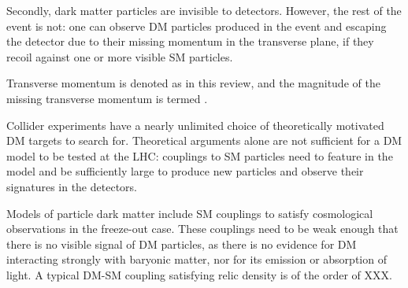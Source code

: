 
Secondly, dark matter particles are invisible to detectors. 
However, the rest of the event is not: one can observe DM particles
produced in the event and escaping the detector 
due to their missing momentum in the transverse plane, 
if they recoil against one or more visible SM particles. 

\begin{marginnote}[]
Transverse momentum is denoted as \pt in this review, 
and the magnitude of the missing transverse momentum is 
termed \MET. 
\end{marginnote}



Collider experiments have a nearly unlimited choice of theoretically
motivated DM targets to search for. 
Theoretical arguments alone are not sufficient for a DM model to be tested at the LHC: 
couplings to SM particles need to feature in the model and be sufficiently large
to produce new particles and observe their signatures in the detectors. 


Models of particle dark matter include SM couplings to satisfy cosmological observations in the freeze-out case. These couplings need to be weak enough that there is no visible signal of DM particles, as there is no evidence for DM interacting strongly with baryonic matter, nor for its emission or absorption of light. A typical DM-SM coupling satisfying relic density is of the order of XXX. %

